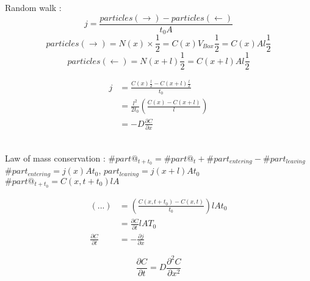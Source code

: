 \documentclass[10pt,a4paper]{article}
\begin{document}
Random walk :
\[ j = \frac{particles(\rightarrow)-particles(\leftarrow)}{t_0 A} \]
\[ particles(\rightarrow) = N(x)\times \frac{1}{2} = C(x)V_{Box}\frac{1}{2} = C(x)Al\frac{1}{2} \]
\[ particles (\leftarrow) = N(x+l)\frac{1}{2} = C(x+l)Al\frac{1}{2} \]


\begin{align*}
    j &= \frac{C(x)\frac{l}{2} - C(x+l)\frac{l}{2}}{t_0}\\
    &= \frac{l^2}{2t_0}\left( \frac{C(x) - C(x+l)}{l} \right)\\
    &= -D\frac{\partial C}{\partial x}
\end{align*}

~\\
Law of mass conservation : $\#part@_{t+t_0} = \#part@_t + \#part_{entering} - \#part_{leaving}$\\
$\#part_{entering} = j(x)At_0$, $part_{leaving} = j(x+l)At_0$\\
$\#part@_{t+t_0} = C(x,t+t_0)lA$

\begin{align*}
(...) &= \left( \frac{C(x,t+t_0) - C(x,t)}{t_0} \right) lAt_0\\
&= \frac{\partial C}{\partial t}lAT_0\\
\frac{\partial C}{\partial t} &= -\frac{\partial j}{\partial x}
\end{align*}

\[ \frac{\partial C}{\partial t} = D\frac{\partial^2C}{\partial x^2} \]
\end{document}
